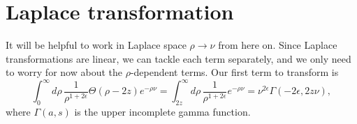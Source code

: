 \documentclass[11pt,twoside,reqno]{amsart}
\theoremstyle{plain}
\theoremstyle{remark}
\theoremstyle{definition}
\theoremstyle{remark}
\theoremstyle{definition}
\theoremstyle{definition}
\begin{document}
\section{Laplace transformation}

	It will be helpful to work in Laplace space $\rho \to \nu$ from here on. Since Laplace transformations are linear, we can tackle each term separately, and we only need to worry for now about the $\rho$-dependent terms. Our first term to transform is
	\begin{equation}
		\int_{0}^\infty d\rho \, \frac{1}{\rho^{1 + 2\epsilon}} \Theta(\rho - 2z) e^{-\rho \nu} = \int_{2z}^\infty d\rho \, \frac{1}{\rho^{1 + 2\epsilon}} e^{-\rho \nu} = \nu^{2\epsilon} \Gamma(-2\epsilon, 2 z \nu),
	\end{equation}
	where $\Gamma(a, s)$ is the upper incomplete gamma function. 
\end{document}
